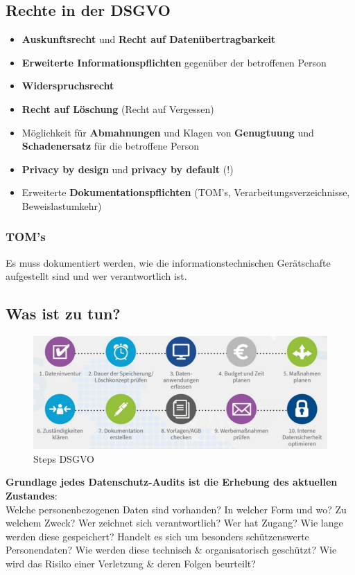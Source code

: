 \hypertarget{rechte-in-der-dsgvo}{%
\subsection{Rechte in der DSGVO}\label{rechte-in-der-dsgvo}}

\begin{itemize}
\tightlist
\item
  \textbf{Auskunftsrecht} und \textbf{Recht auf Datenübertragbarkeit}
\item
  \textbf{Erweiterte Informationspflichten} gegenüber der betroffenen
  Person
\item
  \textbf{Widerspruchsrecht}
\item
  \textbf{Recht auf Löschung} (Recht auf Vergessen)
\item
  Möglichkeit für \textbf{Abmahnungen} und Klagen von
  \textbf{Genugtuung} und \textbf{Schadenersatz} für die betroffene
  Person
\item
  \textbf{Privacy by design} und \textbf{privacy by default} (!)
\item
  Erweiterte \textbf{Dokumentationspflichten} (TOM's,
  Verarbeitungsverzeichnisse, Beweislastumkehr)
\end{itemize}

\hypertarget{toms}{%
\subsubsection{TOM's}\label{toms}}

Es muss dokumentiert werden, wie die informationstechnischen
Gerätschafte aufgestellt sind und wer verantwortlich ist.

\hypertarget{was-ist-zu-tun}{%
\subsection{Was ist zu tun?}\label{was-ist-zu-tun}}

\begin{figure}
\centering
\includegraphics{figures/dsgvoSteps.png}
\caption{Steps DSGVO}
\end{figure}

\textbf{Grundlage jedes Datenschutz-Audits ist die Erhebung des
aktuellen Zustandes}:\\
Welche personenbezogenen Daten sind vorhanden? In welcher Form und wo?
Zu welchem Zweck? Wer zeichnet sich verantwortlich? Wer hat Zugang? Wie
lange werden diese gespeichert? Handelt es sich um besonders
schützenswerte Personendaten? Wie werden diese technisch \&
organisatorisch geschützt? Wie wird das Risiko einer Verletzung \& deren
Folgen beurteilt?
